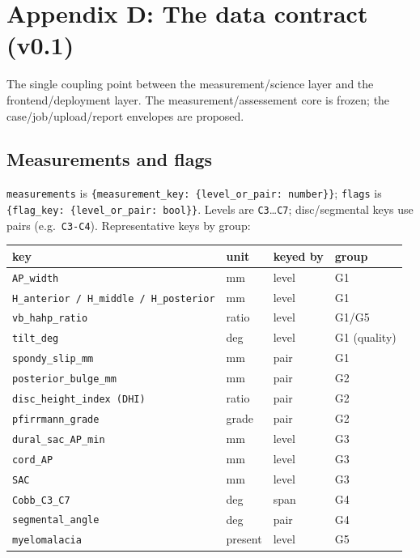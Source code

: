 \section{Appendix D: The data contract (v0.1)}
\label{app:contract}

The single coupling point between the measurement/science layer and the frontend/deployment layer. The
measurement/assessement core is frozen; the case/job/upload/report envelopes are proposed.

\subsection{Measurements and flags}
\texttt{measurements} is \texttt{\{measurement\_key: \{level\_or\_pair: number\}\}}; \texttt{flags} is
\texttt{\{flag\_key: \{level\_or\_pair: bool\}\}}. Levels are \texttt{C3}\ldots\texttt{C7}; disc/segmental
keys use pairs (e.g.\ \texttt{C3-C4}). Representative keys by group:

\begin{center}\footnotesize
\begin{longtable}{l l l l}
\toprule
key & unit & keyed by & group \\
\midrule \endhead
\texttt{AP\_width} & mm & level & G1 \\
\texttt{H\_anterior / H\_middle / H\_posterior} & mm & level & G1 \\
\texttt{vb\_hahp\_ratio} & ratio & level & G1/G5 \\
\texttt{tilt\_deg} & deg & level & G1 (quality) \\
\texttt{spondy\_slip\_mm} & mm & pair & G1 \\
\texttt{posterior\_bulge\_mm} & mm & pair & G2 \\
\texttt{disc\_height\_index (DHI)} & ratio & pair & G2 \\
\texttt{pfirrmann\_grade} & grade & pair & G2 \\
\texttt{dural\_sac\_AP\_min} & mm & level & G3 \\
\texttt{cord\_AP} & mm & level & G3 \\
\texttt{SAC} & mm & level & G3 \\
\texttt{Cobb\_C3\_C7} & deg & span & G4 \\
\texttt{segmental\_angle} & deg & pair & G4 \\
\texttt{myelomalacia} & present & level & G5 \\
\bottomrule
\end{longtable}
\end{center}

